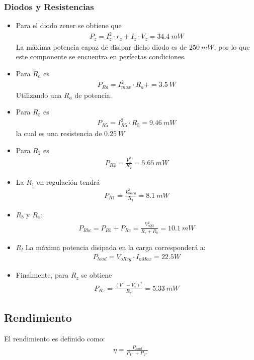 \subsubsection{Diodos y Resistencias}
\begin{itemize}
	\item Para el diodo zener se obtiene que
	\begin{align}
		P_{z}=I_{z}^2\cdot r_z+I_z \cdot V_z = 34.4 \ mW
	\end{align}
	La máxima potencia capaz de disipar dicho diodo es de $250 \ mW$, por lo que este componente se encuentra en perfectas condiciones.

	\item Para $R_a$ es 
	\begin{align}
		P_{Ra}=I_{max}^2\cdot R_a+ = 3.5 \ W
	\end{align}
	Utilizando una $R_a$ de potencia.

	\item Para $R_5$ es
	\begin{align}
		P_{R5}=I_{R5}^2\cdot R_5 = 9.46 \ mW
	\end{align}
	la cual es una resistencia de $0.25 \ W$

	\item Para $R_2$ es
	\begin{align}
		P_{R2}=\frac{V_z^2}{R_2} = 5.65 \ mW
	\end{align}
	\item La $R_1$ en regulación tendrá 
	\begin{align}
		P_{R1}=\frac{V_{oReg}^2}{R_1} = 8.1 \ mW
	\end{align}
	\item $R_b$ y $R_c$:
	\begin{align}
		P_{Rbc}=P_{Rb} + P_{Rc}=\frac{V_{eQ3}^2}{R_c+R_b} = 10.1 \ mW
	\end{align}
	\item $R_l$ La máxima potencia disipada en la carga corresponderá a:
	\begin{align}
		P_{load}= V_{oReg}\cdot I_{oMax}=22.5W
	\end{align}
	\item Finalmente, para $R_z$ se obtiene
	\begin{align}
		P_{Rz}=\frac{(V^- - V_z)^2}{R_z} = 5.33 \ mW
	\end{align}
\end{itemize}

\subsection{Rendimiento}
El rendimiento es definido como:
\begin{align}
\eta = \frac{P_{load}}{P_{V^-}+P_{V^+}}
\end{align}
